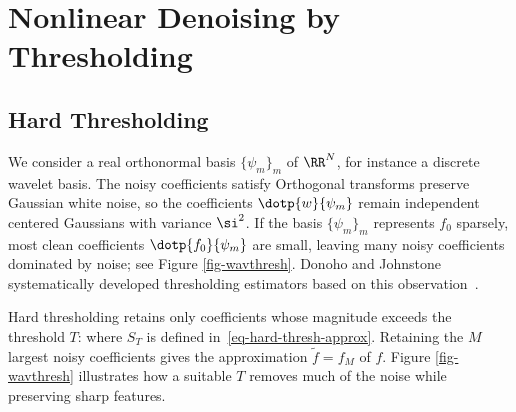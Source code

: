 \section{Nonlinear Denoising by Thresholding}
\label{sec-nl-denoising-thresh}

\subsection{Hard Thresholding}
\label{subsec-denoise-hard}

We consider a real orthonormal basis $\{\psi_m\}_m$ of $\RR^N$, for instance a discrete wavelet basis.
%
The noisy coefficients satisfy
Orthogonal transforms preserve Gaussian white noise, so the coefficients $\dotp{w}{\psi_m}$ remain independent centered Gaussians with variance $\si^2$. If the basis $\{\psi_m\}_m$ represents $f_0$ sparsely, most clean coefficients $ \dotp{f_0}{\psi_m}$ are small, leaving many noisy coefficients dominated by noise; see Figure \ref{fig-wavthresh}. Donoho and Johnstone systematically developed thresholding estimators based on this observation~\cite{donoho-shrinkage}.


Hard thresholding retains only coefficients whose magnitude exceeds the threshold $T$:
where $S_T$ is defined in~\eqref{eq-hard-thresh-approx}. Retaining the $M$ largest noisy coefficients gives the approximation $\tilde f = f_M$ of $f$. Figure \ref{fig-wavthresh} illustrates how a suitable $T$ removes much of the noise while preserving sharp features.


